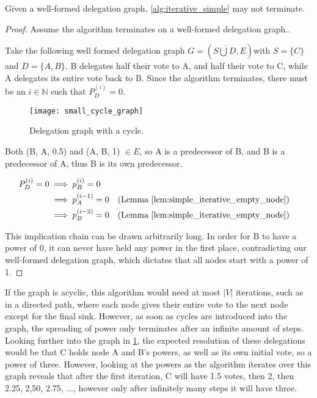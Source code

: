 \begin{theorem}\label{alg:iterative_alg_doesnt_terminate}
Given a well-formed delegation graph, \cref{alg:iterative_simple} may not terminate.
\end{theorem}
\begin{proof} Assume the algorithm terminates on a well-formed delegation graph..

Take the following well formed delegation graph $G = (S \dot\bigcup D, E)$with $S =\{C\}$ and $D = \{A, B\}$. B delegates half their vote to A, and half their vote to C, while A delegates its entire vote back to B. Since the algorithm terminates, there must be an $i \in \mathbb{N}$ such that $P_D^{(i)} = 0$. 

\begin{figure}[t]
    \centering
    \texttt{[image: small\_cycle\_graph]}
    \caption{Delegation graph with a cycle.}
    \label{fig:small_cycle_graph}
\end{figure}


Both (B, A, 0.5) and (A, B, 1) $\in E$, so A is a predecessor of B, and B is a predecessor of A, thus B is its own predecessor.

\begin{align*}
	P_D^{(i)} = 0 
	&\implies p_B^{(i)} = 0 \\
	&\implies p_A^{(i-1)} = 0 &&\text{(Lemma \cref{lem:simple_iterative_empty_node})} \\
	&\implies p_B^{(i-2)} = 0 &&\text{(Lemma \cref{lem:simple_iterative_empty_node})}
\end{align*}

This implication chain can be drawn arbitrarily long. In order for B to have a power of 0, it can never have held any power in the first place, contradicting our well-formed delegation graph, which dictates that all nodes start with a power of 1.
\end{proof}

If the graph is acyclic, this algorithm would need at most $|V|$ iterations, such as in a directed path, where each node gives their entire vote to the next node except for the final sink. However, as soon as cycles are introduced into the graph, the spreading of power only terminates after an infinite amount of steps. Looking further into the graph in \cref{fig:small_cycle_graph}, the expected resolution of these delegations would be that C holds node A and B's powers, as well as its own initial vote, so a power of three. However, looking at the powers as the algorithm iterates over this graph reveals that after the first iteration, C will have 1.5 votes, then 2, then 2.25, 2,50, 2.75, ..., however only after infinitely many steps it will have three. 

